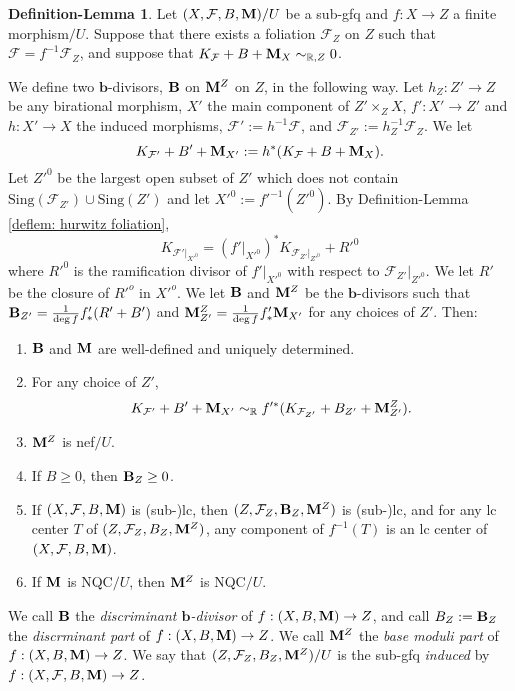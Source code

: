 \documentclass[11pt]{amsart}
\numberwithin{equation}{section}
\newcommand{\bb}{\bm{b}}
\newcommand{\Mm}{{\bf{M}}}
\newcommand{\Bb}{{\bf{B}}}
\newcommand{\Ff}{\mathcal{F}}
\newcommand{\Sing}{\mathrm{Sing}}
\theoremstyle{definition}
\theoremstyle{definition}
\newtheorem{deflem}[thm]{Definition-Lemma}
\theoremstyle{definition}
\begin{document}
\begin{deflem}\label{deflem: cbf finite}
Let $(X,\Ff,B,\Mm)/U$ be a sub-gfq and $f: X\rightarrow Z$ a finite morphism$/U$. Suppose that there exists a foliation $\Ff_Z$ on $Z$ such that $\Ff=f^{-1}\Ff_Z$, and suppose that $K_{\Ff}+B+\Mm_X\sim_{\mathbb R,Z}0$.

We define two $\bb$-divisors, $\Bb$ on $\Mm^Z$ on $Z$, in the following way. Let $h_Z: Z'\rightarrow Z$ be any birational morphism, $X'$ the main component of $Z'\times_{Z}X$, $f': X'\rightarrow Z'$ and $h: X'\rightarrow X$ the induced morphisms, $\Ff':=h^{-1}\Ff$, and $\Ff_{Z'}:=h_Z^{-1}\Ff_Z$. We let $$K_{\Ff'}+B'+\Mm_{X'}:=h^*(K_{\Ff}+B+\Mm_X).$$
Let $Z'^0$ be the largest open subset of $Z'$ which does not contain $\Sing(\Ff_{Z'})\cup\Sing(Z')$ and let $X'^0:=f'^{-1}(Z'^0)$. By Definition-Lemma \ref{deflem: hurwitz foliation}, 
$$K_{\Ff'|_{X'^0}}=(f'|_{X'^0})^*K_{\Ff_{Z'}|_{Z'^0}}+R'^0$$
where $R'^0$ is the ramification divisor of $f'|_{X'^0}$ with respect to $\Ff_{Z'}|_{Z'^0}$. We let $R'$ be the closure of $R'^o$ in $X'^o$. We let $\Bb$ and $\Mm^Z$ be the $\bb$-divisors such that $\Bb_{Z'}=\frac{1}{\deg f}f'_*(R'+B')$ and $\Mm^Z_{Z'}=\frac{1}{\deg f}f'_*\Mm_{X'}$ for any choices of $Z'$. Then:
\begin{enumerate}
   \item $\Bb$ and $\Mm$ are well-defined and uniquely determined.
    \item For any choice of $Z'$,
    $$K_{\Ff'}+B'+\Mm_{X'}\sim_{\mathbb R}f'^*(K_{\Ff_{Z'}}+B_{Z'}+\Mm^Z_{Z'}).$$
    \item $\Mm^Z$ is nef$/U$.
    \item If $B\geq 0$, then $\Bb_Z\geq 0$.
    \item If $(X,\Ff,B,\Mm)$ is (sub-)lc, then $(Z,\Ff_Z,\Bb_Z,\Mm^Z)$ is (sub-)lc, and for any lc center $T$ of $(Z,\Ff_Z,B_Z,\Mm^Z)$, any component of $f^{-1}(T)$ is an lc center of $(X,\Ff,B,\Mm)$.
    \item If $\Mm$ is NQC$/U$, then $\Mm^Z$ is NQC$/U$.
\end{enumerate}
We call $\Bb$ the \emph{discriminant $\bb$-divisor} of $f: (X,B,\Mm)\rightarrow Z$, and call $B_Z:=\Bb_Z$ the \emph{discrminant part} of $f: (X,B,\Mm)\rightarrow Z$. We call $\Mm^Z$ the \emph{base moduli part} of $f: (X,B,\Mm)\rightarrow Z$. We say that $(Z,\Ff_Z,B_Z,\Mm^Z)/U$ is the sub-gfq \emph{induced} by $f: (X,\Ff,B,\Mm)\rightarrow Z$.
\end{deflem}
\end{document}
